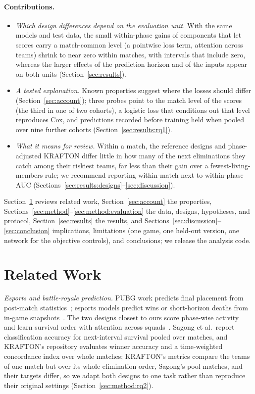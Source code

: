 \documentclass[sigconf,anonymous]{acmart}
\begin{document}
\paragraph{Contributions.}
\begin{itemize}
\item \emph{Which design differences depend on the evaluation unit.} With the same models and test data, the small within-phase gains of components that let scores carry a match-common level (a pointwise loss term, attention across teams) shrink to near zero within matches, with intervals that include zero, whereas the larger effects of the prediction horizon and of the inputs appear on both units (Section~\ref{sec:results}).
\item \emph{A tested explanation.} Known properties suggest where the losses should differ (Section~\ref{sec:account}); three probes point to the match level of the scores (the third in one of two cohorts), a logistic loss that conditions out that level reproduces Cox, and predictions recorded before training held when pooled over nine further cohorts (Section~\ref{sec:results:rq1}).
\item \emph{What it means for review.} Within a match, the reference designs and phase-adjusted KRAFTON differ little in how many of the next eliminations they catch among their riskiest teams, far less than their gain over a fewest-living-members rule; we recommend reporting within-match next to within-phase AUC (Sections~\ref{sec:results:designs}--\ref{sec:discussion}).
\end{itemize}
Section~\ref{sec:related} reviews related work, Section~\ref{sec:account} the properties, Sections~\ref{sec:method}--\ref{sec:method:evaluation} the data, designs, hypotheses, and protocol, Section~\ref{sec:results} the results, and Sections~\ref{sec:discussion}--\ref{sec:conclusion} implications, limitations (one game, one held-out version, one network for the objective controls), and conclusions; we release the analysis code.

\section{Related Work}
\label{sec:related}
\emph{Esports and battle-royale prediction.} PUBG work predicts final placement from post-match statistics~\cite{KagglePUBG,LeeLee25}; esports models predict wins or short-horizon deaths from in-game snapshots~\cite{Hodge21,Katona19,Marshall22}. The two designs closest to ours score phase-wise activity~\cite{Sagong25a} and learn survival order with attention across squads~\cite{KRAFTON}. Sagong et al.\ report classification accuracy for next-interval survival pooled over matches, and KRAFTON's repository evaluates winner accuracy and a time-weighted concordance index over whole matches; KRAFTON's metrics compare the teams of one match but over its whole elimination order, Sagong's pool matches, and their targets differ, so we adapt both designs to one task rather than reproduce their original settings (Section~\ref{sec:method:rq2}).
\end{document}
